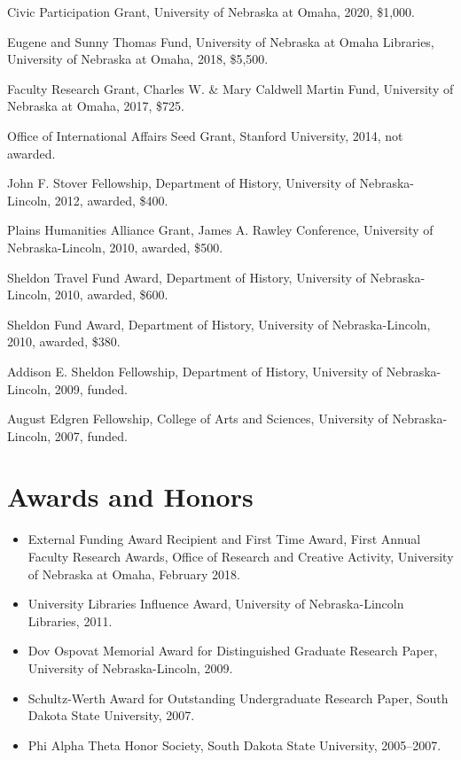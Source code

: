 Civic Participation Grant, University of Nebraska at Omaha, 2020,
\$1,000.

Eugene and Sunny Thomas Fund, University of Nebraska at Omaha Libraries,
University of Nebraska at Omaha, 2018, \$5,500.

Faculty Research Grant, Charles W. \& Mary Caldwell Martin Fund,
University of Nebraska at Omaha, 2017, \$725.

Office of International Affairs Seed Grant, Stanford University, 2014,
not awarded.

John F. Stover Fellowship, Department of History, University of
Nebraska-Lincoln, 2012, awarded, \$400.

Plains Humanities Alliance Grant, James A. Rawley Conference, University
of Nebraska-Lincoln, 2010, awarded, \$500.

Sheldon Travel Fund Award, Department of History, University of
Nebraska-Lincoln, 2010, awarded, \$600.

Sheldon Fund Award, Department of History, University of
Nebraska-Lincoln, 2010, awarded, \$380.

Addison E. Sheldon Fellowship, Department of History, University of
Nebraska-Lincoln, 2009, funded.

August Edgren Fellowship, College of Arts and Sciences, University of
Nebraska-Lincoln, 2007, funded.

\section{Awards and Honors}\label{awards-and-honors}

\begin{itemize}
\tightlist
\item
  External Funding Award Recipient and First Time Award, First Annual
  Faculty Research Awards, Office of Research and Creative Activity,
  University of Nebraska at Omaha, February 2018.
\item
  University Libraries Influence Award, University of Nebraska-Lincoln
  Libraries, 2011.
\item
  Dov Ospovat Memorial Award for Distinguished Graduate Research Paper,
  University of Nebraska-Lincoln, 2009.
\item
  Schultz-Werth Award for Outstanding Undergraduate Research Paper,
  South Dakota State University, 2007.
\item
  Phi Alpha Theta Honor Society, South Dakota State University,
  2005--2007.
\end{itemize}

